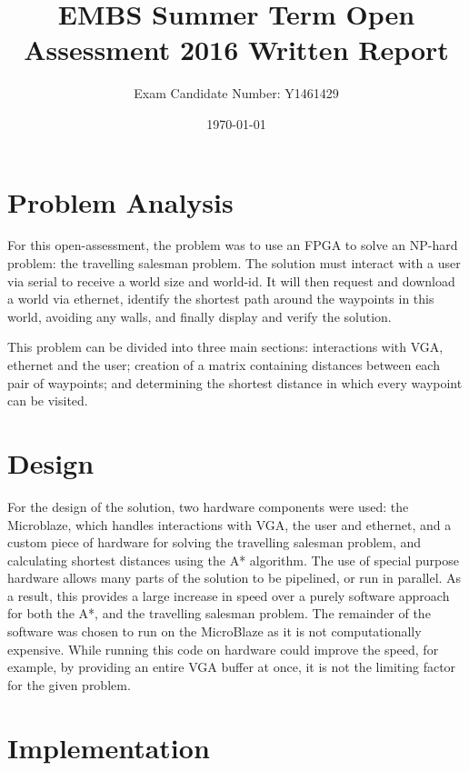 \documentclass[a4paper, 11pt]{article}
\title{EMBS Summer Term Open Assessment 2016 Written Report}
\author{Exam Candidate Number: Y1461429}
\date{\today}
\begin{document}
\maketitle
\section{Problem Analysis} %
For this open-assessment, the problem was to use an FPGA to solve an NP-hard 
problem: the travelling salesman problem. The solution must interact with a user 
via serial to receive a world size and world-id. It will then
request and download a world via ethernet, identify the shortest path around the 
waypoints in this world, avoiding any walls, and finally display and verify the solution. 
\par\bigskip\noindent
This problem can be divided into three main sections: interactions with VGA, ethernet
and the user; creation of a matrix containing distances between each pair of waypoints;
and determining the shortest distance in which every waypoint can be visited.

\section{Design} %
For the design of the solution, two hardware components were used: the Microblaze, 
which handles interactions with VGA, the user and ethernet, 
and a custom piece of hardware for solving the travelling salesman problem, and 
calculating shortest distances using the A* algorithm. The use of special purpose 
hardware allows many parts of the solution to be pipelined, or run in parallel. 
As a result, this provides a large increase in speed over a purely software approach 
for both the A*, and the travelling salesman problem. The remainder of the software 
was chosen to run on the MicroBlaze as it is not computationally expensive. 
While running this code on hardware could improve the speed, for example, by 
providing an entire VGA buffer at once, it is not the limiting factor for the 
given problem.

\section{Implementation} %
\end{document}
